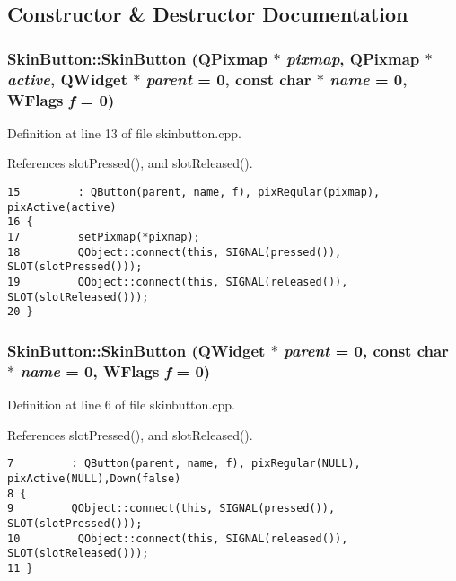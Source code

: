 \subsection{Constructor \& Destructor Documentation}
\subsubsection{\setlength{\rightskip}{0pt plus 5cm}Skin\-Button::Skin\-Button (QPixmap $\ast$ {\em pixmap}, QPixmap $\ast$ {\em active}, {\bf QWidget} $\ast$ {\em parent} = 0, const char $\ast$ {\em name} = 0, WFlags {\em f} = 0)}\label{classSkinButton_SkinButtona0}




Definition at line 13 of file skinbutton.cpp.

References slot\-Pressed(), and slot\-Released().



\footnotesize\begin{verbatim}15         : QButton(parent, name, f), pixRegular(pixmap), pixActive(active)
16 {
17         setPixmap(*pixmap);
18         QObject::connect(this, SIGNAL(pressed()), SLOT(slotPressed()));
19         QObject::connect(this, SIGNAL(released()), SLOT(slotReleased()));
20 }
\end{verbatim}\normalsize 
{}
\subsubsection{\setlength{\rightskip}{0pt plus 5cm}Skin\-Button::Skin\-Button ({\bf QWidget} $\ast$ {\em parent} = 0, const char $\ast$ {\em name} = 0, WFlags {\em f} = 0)}\label{classSkinButton_SkinButtona1}




Definition at line 6 of file skinbutton.cpp.

References slot\-Pressed(), and slot\-Released().



\footnotesize\begin{verbatim}7         : QButton(parent, name, f), pixRegular(NULL), pixActive(NULL),Down(false)
8 {
9         QObject::connect(this, SIGNAL(pressed()), SLOT(slotPressed()));
10         QObject::connect(this, SIGNAL(released()), SLOT(slotReleased()));
11 }
\end{verbatim}\normalsize 


